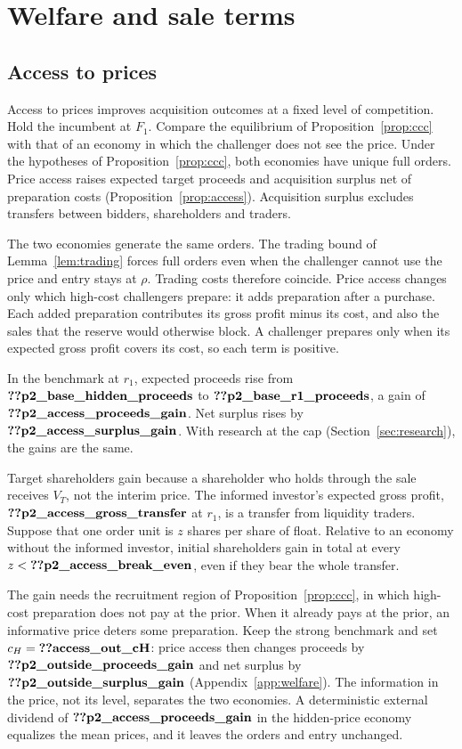 \section{Welfare and sale terms}\label{sec:welfare}

\subsection{Access to prices}\label{sec:access}

Access to prices improves acquisition outcomes at a fixed level of competition. Hold the incumbent at \(F_1\).
Compare the equilibrium of Proposition~\ref{prop:ccc} with that of an economy in which the challenger does not see the
price. Under the hypotheses of Proposition~\ref{prop:ccc}, both economies have unique full orders. Price access raises
expected target proceeds and acquisition surplus net of preparation costs (Proposition~\ref{prop:access}). Acquisition
surplus excludes transfers between bidders, shareholders and traders.

The two economies generate the same orders. The trading bound of Lemma~\ref{lem:trading} forces full orders even
when the challenger cannot use the price and entry stays at \(\rho\). Trading costs therefore coincide. Price access
changes only which high-cost challengers prepare: it adds preparation after a purchase. Each added preparation
contributes its gross profit minus its cost, and also the sales that the reserve would otherwise block. A challenger
prepares only when its expected gross profit covers its cost, so each term is positive.

In the benchmark at \(r_1\), expected proceeds rise from \(\reg{p2_base_hidden_proceeds}\) to
\(\reg{p2_base_r1_proceeds}\), a gain of \(\reg{p2_access_proceeds_gain}\). Net surplus rises by
\(\reg{p2_access_surplus_gain}\). With research at the cap (Section~\ref{sec:research}), the gains are the same.

Target shareholders gain because a shareholder who holds through the sale receives \(V_T\), not the interim price.
The informed investor's expected gross profit, \(\reg{p2_access_gross_transfer}\) at \(r_1\), is a transfer from
liquidity traders. Suppose that one order unit is \(z\) shares per share of float. Relative to an economy without the
informed investor, initial shareholders gain in total at every \(z<\reg{p2_access_break_even}\), even if they bear the
whole transfer.

The gain needs the recruitment region of Proposition~\ref{prop:ccc}, in which high-cost preparation does not pay at
the prior. When it already pays at the prior, an informative price deters some preparation. Keep the strong benchmark
and set \(c_H=\reg{access_out_cH}\): price access then changes proceeds by \(\reg{p2_outside_proceeds_gain}\) and net
surplus by \(\reg{p2_outside_surplus_gain}\) (Appendix~\ref{app:welfare}). The information in the price, not its
level, separates the two economies. A deterministic external dividend of \(\reg{p2_access_proceeds_gain}\) in the
hidden-price economy equalizes the mean prices, and it leaves the orders and entry unchanged.

